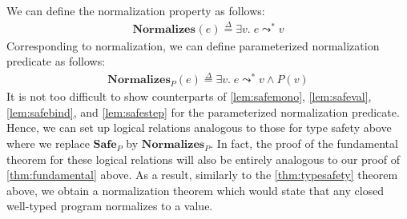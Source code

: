 \documentclass{article}
\newcommand{\defeq}{\overset{\Delta}{=}}
\newcommand{\pred}{P}
\newcommand{\expr}{e}
\newcommand{\val}{v}
\newcommand{\steps}{\leadsto^*}
\newcommand{\Safe}[1]{\textbf{Safe}_{#1}}
\begin{document}
\newcommand{\Normalizes}[1]{\mathbf{Normalizes}_{#1}}

We can define the normalization property as follows:
\begin{align*}
  \Normalizes{}(\expr) \defeq{} \exists \val.\; \expr \steps \val
\end{align*}
Corresponding to normalization, we can define parameterized normalization predicate as follows:
\begin{align*}
  \Normalizes{\pred}(\expr) \defeq{} \exists \val.\; \expr \steps \val \land \pred(\val)
\end{align*}
It is not too difficult to show counterparts of \ref{lem:safemono}, \ref{lem:safeval}, \ref{lem:safebind}, and \ref{lem:safestep} for the parameterized normalization predicate.
Hence, we can set up logical relations analogous to those for type safety above where we replace $\Safe{\pred}$ by $\Normalizes{\pred}$.
In fact, the proof of the fundamental theorem for these logical relations will also be entirely analogous to our proof of \ref{thm:fundamental} above.
As a result, similarly to the \ref{thm:typesafety} theorem above, we obtain a normalization theorem which would state that any closed well-typed program normalizes to a value.
\end{document}

